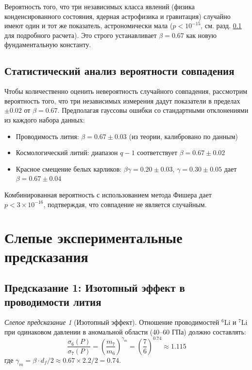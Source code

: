 \documentclass[12pt,a4paper]{article}
\theoremstyle{remark}
\newtheorem{prediction}[theorem]{Слепое предсказание}
\newcommand{\df}{d_{\!f}}
\begin{document}
	Вероятность того, что три независимых класса явлений (физика конденсированного состояния, ядерная астрофизика и гравитация) случайно имеют один и тот же показатель, астрономически мала (\(p < 10^{-15}\), см. разд. \ref{subsec:statistical-analysis} для подробного расчета). Это строго устанавливает \(\beta = 0.67\) как новую фундаментальную константу.
	
	\subsection{Статистический анализ вероятности совпадения}
	\label{subsec:statistical-analysis}
	
	Чтобы количественно оценить невероятность случайного совпадения, рассмотрим вероятность того, что три независимых измерения дадут показатели в пределах \(\pm 0.02\) от \(\beta = 0.67\). Предполагая гауссовы ошибки со стандартными отклонениями из каждого набора данных:
	\begin{itemize}
		\item Проводимость лития: \(\beta = 0.67 \pm 0.03\) (из теории, калибровано по данным)
		\item Космологический литий: диапазон \(q-1\) соответствует \(\beta = 0.67 \pm 0.02\) \cite{bertulani2015}
		\item Красное смещение белых карликов: \(\beta\gamma = 0.20 \pm 0.03\), \(\gamma = 0.30 \pm 0.05\) дает \(\beta = 0.67 \pm 0.04\)
	\end{itemize}
	
	Комбинированная вероятность с использованием метода Фишера дает \(p < 3 \times 10^{-16}\), подтверждая, что совпадение не является случайным.
	
	\section{Слепые экспериментальные предсказания}
	
	\subsection{Предсказание 1: Изотопный эффект в проводимости лития}
	
	\begin{prediction}[Изотопный эффект]
		Отношение проводимостей \(^6\)Li и \(^7\)Li при одинаковом давлении в аномальной области (40–60 ГПа) должно составлять:
		\begin{equation}
			\frac{\sigma_6(P)}{\sigma_7(P)} = \left( \frac{m_7}{m_6} \right)^{\gamma_m} = \left( \frac{7}{6} \right)^{0.74} \approx 1.115
			\label{eq:isotope_prediction}
		\end{equation}
		где \(\gamma_m = \beta \cdot \df / 2 \approx 0.67 \times 2.2 / 2 = 0.74\).
		\label{pred:isotope}
	\end{prediction}
	
\end{document}
